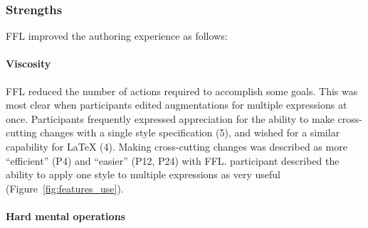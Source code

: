 


\subsubsection{Strengths} FFL improved the authoring experience as follows:

\paragraph{Viscosity}
FFL reduced the number of actions required to accomplish some goals. This was most clear when participants edited augmentations for multiple expressions at once. Participants frequently expressed appreciation for the ability to make cross-cutting changes with a single style specification (5), and wished for a similar capability for LaTeX (4). Making cross-cutting changes was described as more ``efficient'' (P4) and ``easier'' (P12, P24) with FFL.  participant described the ability to apply one style to multiple expressions as very useful (Figure~\ref{fig:features_use}).




\paragraph{Hard mental operations}

